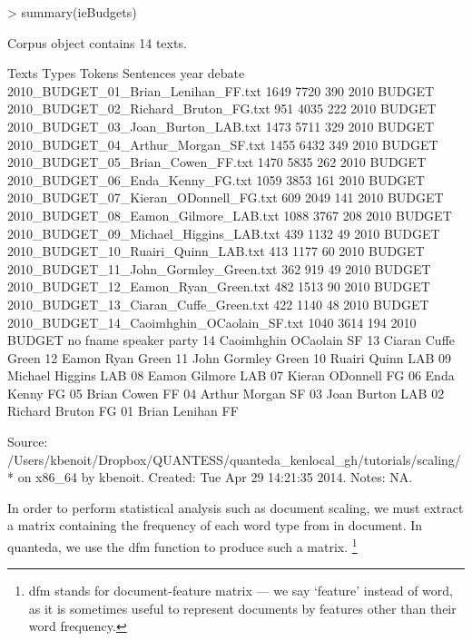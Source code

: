 \documentclass{article}
\begin{document}
\begin{Schunk}
\begin{Sinput}
> summary(ieBudgets)
\end{Sinput}
\begin{Soutput}
Corpus object contains 14 texts.

                                     Texts Types Tokens Sentences year debate
       2010_BUDGET_01_Brian_Lenihan_FF.txt  1649   7720       390 2010 BUDGET
      2010_BUDGET_02_Richard_Bruton_FG.txt   951   4035       222 2010 BUDGET
        2010_BUDGET_03_Joan_Burton_LAB.txt  1473   5711       329 2010 BUDGET
       2010_BUDGET_04_Arthur_Morgan_SF.txt  1455   6432       349 2010 BUDGET
         2010_BUDGET_05_Brian_Cowen_FF.txt  1470   5835       262 2010 BUDGET
          2010_BUDGET_06_Enda_Kenny_FG.txt  1059   3853       161 2010 BUDGET
     2010_BUDGET_07_Kieran_ODonnell_FG.txt   609   2049       141 2010 BUDGET
      2010_BUDGET_08_Eamon_Gilmore_LAB.txt  1088   3767       208 2010 BUDGET
    2010_BUDGET_09_Michael_Higgins_LAB.txt   439   1132        49 2010 BUDGET
       2010_BUDGET_10_Ruairi_Quinn_LAB.txt   413   1177        60 2010 BUDGET
     2010_BUDGET_11_John_Gormley_Green.txt   362    919        49 2010 BUDGET
       2010_BUDGET_12_Eamon_Ryan_Green.txt   482   1513        90 2010 BUDGET
     2010_BUDGET_13_Ciaran_Cuffe_Green.txt   422   1140        48 2010 BUDGET
 2010_BUDGET_14_Caoimhghin_OCaolain_SF.txt  1040   3614       194 2010 BUDGET
 no      fname  speaker party
 14 Caoimhghin OCaolain    SF
 13     Ciaran    Cuffe Green
 12      Eamon     Ryan Green
 11       John  Gormley Green
 10     Ruairi    Quinn   LAB
 09    Michael  Higgins   LAB
 08      Eamon  Gilmore   LAB
 07     Kieran ODonnell    FG
 06       Enda    Kenny    FG
 05      Brian    Cowen    FF
 04     Arthur   Morgan    SF
 03       Joan   Burton   LAB
 02    Richard   Bruton    FG
 01      Brian  Lenihan    FF

Source:  /Users/kbenoit/Dropbox/QUANTESS/quanteda_kenlocal_gh/tutorials/scaling/* on x86_64 by kbenoit.
Created: Tue Apr 29 14:21:35 2014.
Notes:   NA.
\end{Soutput}
\end{Schunk}

In order to perform statistical analysis such as document scaling, we must extract a matrix containing the frequency of each word type from in document. In quanteda, we use the dfm function to produce such a matrix. \footnote{dfm stands for document-feature matrix --- we say `feature' instead of word, as it is sometimes useful to represent documents by features other than their word frequency.}
\end{document}
